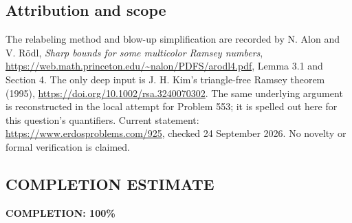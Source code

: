 \subsection*{Attribution and scope}
The relabeling method and blow-up simplification are recorded by N. Alon and V. R\"odl, \emph{Sharp bounds for some multicolor Ramsey numbers}, \url{https://web.math.princeton.edu/~nalon/PDFS/arodl4.pdf}, Lemma 3.1 and Section 4. The only deep input is J. H. Kim's triangle-free Ramsey theorem (1995), \url{https://doi.org/10.1002/rsa.3240070302}. The same underlying argument is reconstructed in the local attempt for Problem 553; it is spelled out here for this question's quantifiers. Current statement: \url{https://www.erdosproblems.com/925}, checked 24 September 2026. No novelty or formal verification is claimed.
\subsection*{COMPLETION ESTIMATE}
\textbf{COMPLETION: 100\%}
